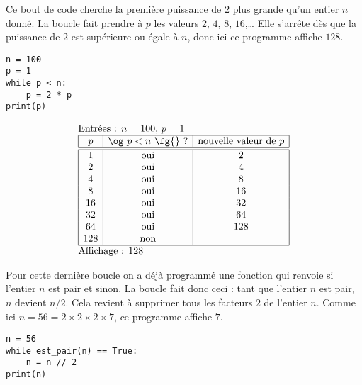\documentclass[11pt,class=report,crop=false]{standalone}
\begin{document}
\begin{cours}
\begin{exemple}
\end{exemple}


\begin{exemple}
\begin{minipage}{0.55\textwidth}
Ce bout de code cherche la première puissance de $2$ plus grande qu'un entier $n$ donné.
La boucle fait prendre à $p$ les valeurs $2$, $4$, $8$, $16$,\ldots{} Elle s'arrête dès que la puissance de $2$ est supérieure ou égale à $n$, donc ici ce programme affiche $128$.
\end{minipage}\qquad\qquad
\begin{minipage}{0.4\textwidth}
\begin{lstlisting}
n = 100
p = 1
while p < n:
    p = 2 * p
print(p)
\end{lstlisting}
\end{minipage}

  $$
  \begin{array}{l}
  \text{Entrées : $n=100$, $p=1$}    \\
  \begin{array}{|c|c|c|}
  \hline  
  p & \text{\og $p < n$ \fg{} ?} & \text{nouvelle valeur de } p \\
  \hline\hline 
  1 & \text{oui} & 2 \\
  2 & \text{oui} & 4 \\
  4 & \text{oui} & 8 \\
  8 & \text{oui} & 16 \\  
  16 & \text{oui} & 32 \\
  32 & \text{oui} & 64 \\ 
  64 & \text{oui} & 128 \\   
  128 & \text{non} &  \\     
  \hline
  \end{array} \\
  \text{Affichage : $128$}  
  \end{array} 
  $$ 
  
\end{exemple}


\begin{exemple}
\begin{minipage}{0.55\textwidth}
Pour cette dernière boucle on a déjà programmé une fonction  qui renvoie  si l'entier $n$ est pair et  sinon. La boucle fait donc ceci : tant que l'entier $n$ est pair, $n$ devient $n/2$. Cela revient à supprimer tous les facteurs $2$ de l'entier $n$. Comme ici $n = 56 = 2\times 2 \times 2 \times 7$, ce programme affiche $7$.
\end{minipage}\qquad\qquad
\begin{minipage}{0.4\textwidth}
\begin{lstlisting}
n = 56
while est_pair(n) == True:
    n = n // 2
print(n)
\end{lstlisting}




\end{minipage}
\end{exemple}
\end{cours}
\end{document}
